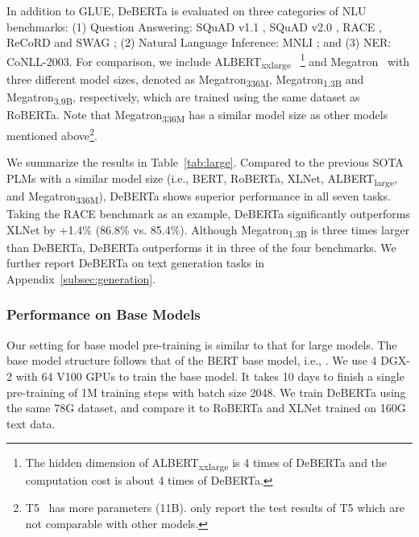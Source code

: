 \documentclass{article}
\newcommand\ModelName{DeBERTa}
\begin{document}
In addition to GLUE, DeBERTa is evaluated on three categories of NLU benchmarks: 
(1) Question Answering: SQuAD v1.1 \citep{squad1}, SQuAD v2.0 \citep{squad2}, RACE \citep{lai2017race}, ReCoRD \citep{zhang2018record} and SWAG \citep{zellers2018swag}; 
(2) Natural Language Inference: MNLI \citep{mnli2018}; and 
(3) NER: CoNLL-2003.
For comparison, we include 
ALBERT\textsubscript{xxlarge}~\citep{lan2019albert}
\footnote{ The hidden dimension of ALBERT\textsubscript{xxlarge} is 4 times of DeBERTa and the computation cost is about 4 times of DeBERTa.} and 
Megatron~\citep{shoeybi2019megatron} with three different model sizes, denoted as Megatron\textsubscript{336M}, Megatron\textsubscript{1.3B} and Megatron\textsubscript{3.9B}, respectively, which are trained using the same dataset as RoBERTa. 
Note that Megatron\textsubscript{336M} has a similar model size as other models mentioned above\footnote{T5~\citep{raffel2019t5} has more parameters (11B). \cite{raffel2019t5} only report the test results of T5 which are not comparable with other models.}. 

We summarize the results in Table~{\ref{tab:large}}. 
Compared to the previous SOTA PLMs with a similar model size (i.e., BERT, RoBERTa, XLNet,  ALBERT\textsubscript{large}, and Megatron\textsubscript{336M}),  {\ModelName} shows superior performance in all seven tasks. 
Taking the RACE benchmark as an example, {\ModelName} significantly outperforms XLNet by +1.4\% (86.8\% vs. 85.4\%). 
Although Megatron\textsubscript{1.3B} is three times larger than {\ModelName}, {\ModelName} outperforms it in three of the four benchmarks. We further report {\ModelName} on text generation tasks in Appendix~\ref{subsec:generation}.


\subsubsection{Performance on Base Models}
Our setting for base model pre-training is similar to that for large models. 
The base model structure follows that of the BERT base model, i.e., . 
We use 4 DGX-2 with 64 V100 GPUs to train the base model. 
It takes 10 days to finish a single pre-training of 1M training steps with batch size 2048. 
We train {\ModelName} using the same 78G dataset, and compare it to RoBERTa and XLNet trained on 160G text data. 
\end{document}
